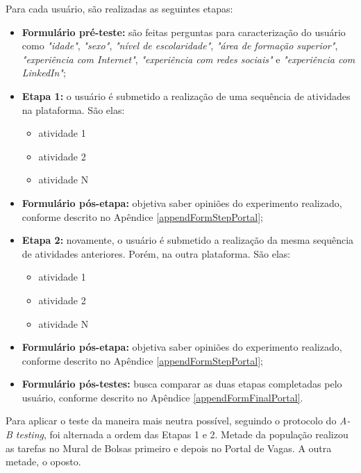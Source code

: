 \documentclass[cic,tc]{iiufrgs}
\begin{document}
Para cada usuário, são realizadas as seguintes etapas:

\begin{itemize}
    \item \textbf{Formulário pré-teste:} são feitas perguntas para caracterização do usuário como \textit{"idade"}, \textit{"sexo"}, \textit{"nível de escolaridade"}, \textit{"área de formação superior"}, \textit{"experiência com Internet"}, \textit{"experiência com redes sociais"} e \textit{"experiência com LinkedIn"};
    
    \item \textbf{Etapa 1:} o usuário é submetido a realização de uma sequência de atividades na plataforma. São elas:
        \begin{itemize}
            \item atividade 1
            \item atividade 2
            \item atividade N
        \end{itemize}
        
    \item \textbf{Formulário pós-etapa:} objetiva saber opiniões do experimento realizado, conforme descrito no Apêndice \ref{appendFormStepPortal};
    
    \item \textbf{Etapa 2:} novamente, o usuário é submetido a realização da mesma sequência de atividades anteriores. Porém, na outra plataforma. São elas:
        \begin{itemize}
            \item atividade 1
            \item atividade 2
            \item atividade N
        \end{itemize}
        
    \item \textbf{Formulário pós-etapa:} objetiva saber opiniões do experimento realizado, conforme descrito no Apêndice \ref{appendFormStepPortal};
    
    \item \textbf{Formulário pós-testes:} busca comparar as duas etapas completadas pelo usuário, conforme descrito no Apêndice \ref{appendFormFinalPortal}.
\end{itemize}

Para aplicar o teste da maneira mais neutra possível, seguindo o protocolo do \textit{A-B testing}, foi alternada a ordem das Etapas 1 e 2. Metade da população realizou as tarefas no Mural de Bolsas primeiro e depois no Portal de Vagas. A outra metade, o oposto.
\end{document}
